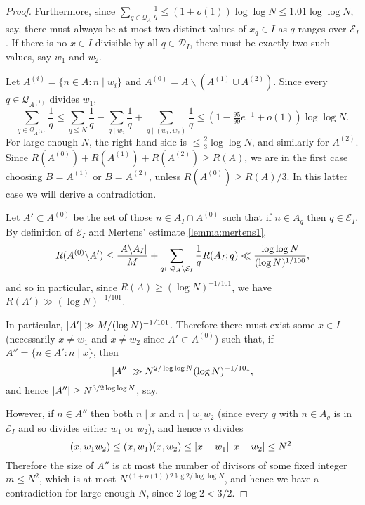 \begin{proof}
Furthermore, since $\sum_{q\in\mathcal{Q}_A}\frac{1}{q}\leq (1+o(1))\log\log N\leq 1.01\log\log N$, say, there must always be at most two distinct values of $x_q\in I$ as $q$ ranges over $\mathcal{E}_I$. If there is no $x\in I$ divisible by all $q\in\mathcal{D}_I$, there must be exactly two such values, say $w_1$ and $w_2$. 

Let $A^{(i)}=\{n\in A: n\mid w_i\}$ and $A^{(0)}=A\backslash (A^{(1)}\cup A^{(2)})$. Since every $q\in\mathcal{Q}_{A^{(1)}}$ divides $w_1$, 
\[\sum_{q\in \mathcal{Q}_{A^{(1)}}}\frac{1}{q}\leq \sum_{q\leq N}\frac{1}{q}- \sum_{q\mid w_2}\frac{1}{q}+ \sum_{q\mid (w_1,w_2)}\frac{1}{q}\leq (1-\tfrac{95}{99}e^{-1}+o(1))\log\log N.\]
For large enough $N$, the right-hand side is $\leq \frac{2}{3}\log\log N$, and similarly for $A^{(2)}$. Since $R(A^{(0)})+R(A^{(1)})+R(A^{(2)})\geq R(A)$, we are in the first case choosing $B=A^{(1)}$ or $B=A^{(2)}$, unless $R(A^{(0)})\geq R(A)/3$. In this latter case we will derive a contradiction.

Let $A'\subset A^{(0)}$ be the set of those $n\in A_I\cap A^{(0)}$ such that if $n\in A_q$ then $q\in\mathcal{E}_I$. By definition of $\mathcal{E}_I$ and Mertens' estimate \ref{lemma:mertens1}, 
\[R(A^{(0)}\backslash A')\leq \frac{\left\lvert A\backslash A_I\right\rvert}{M}+\sum_{q\in\mathcal{Q}_A\backslash \mathcal{E}_I}\frac{1}{q}R(A_I;q)\ll \frac{\log\log N}{(\log N)^{1/100}},\]
and so  in particular, since $R(A)\geq (\log N)^{-1/101}$, we have $R(A')\gg (\log N)^{-1/101}$.

In particular, $\left\lvert A'\right\rvert\gg M/(\log N)^{-1/101}$. Therefore there must exist some $x\in I$ (necessarily $x\neq w_1$ and $x\neq w_2$ since $A'\subset A^{(0)}$) such that, if $A''=\{ n\in A' : n\mid x\}$, then
\[\left\lvert A''\right\rvert\gg N^{2/\log\log N}(\log N)^{-1/101},\]
and hence $\left\lvert A''\right\rvert\geq N^{3/2\log\log N}$, say. 

However, if $n\in A''$ then both $n\mid x$ and $n\mid w_1w_2$ (since every $q$ with $n\in A_q$ is in $\mathcal{E}_I$ and so divides either $w_1$ or $w_2$), and hence $n$ divides
\[(x,w_1w_2)\leq (x,w_1)(x,w_2)\leq \left\lvert x-w_1\right\rvert\left\lvert x-w_2\right\rvert\leq N^2.\]
Therefore the size of $A''$ is at most the number of divisors of some fixed integer $m\leq N^2$, which is at most $N^{(1+o(1))2\log 2/\log\log N}$, and hence we have a contradiction for large enough $N$, since $2\log 2< 3/2$.
\end{proof}


